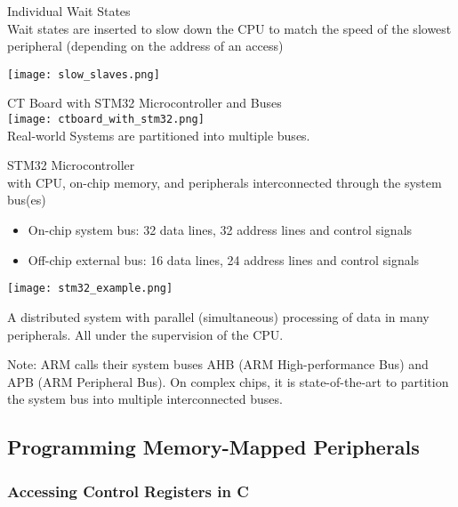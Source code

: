 \begin{KR}{Individual Wait States}\\
    Wait states are inserted to slow down the CPU to match the speed of the slowest peripheral (depending on the address of an access)

    \texttt{[image: slow\_slaves.png]}    
\end{KR}

\begin{example2}{CT Board with STM32 Microcontroller and Buses}\\
    \texttt{[image: ctboard\_with\_stm32.png]}\\
    Real-world Systems are partitioned into multiple buses.
\end{example2}

\begin{example2}{STM32 Microcontroller}\\
    with CPU, on-chip memory, and peripherals interconnected through the system bus(es)
    \begin{itemize}
        \item On-chip system bus: 32 data lines, 32 address lines and control signals
        \item Off-chip external bus: 16 data lines, 24 address lines and control signals
    \end{itemize}
    \texttt{[image: stm32\_example.png]}

    A distributed system with parallel (simultaneous) processing of data in many peripherals. All under the supervision of the CPU.
\end{example2}

\begin{remark}
    Note: ARM calls their system buses AHB (ARM High-performance Bus) and APB (ARM
    Peripheral Bus). On complex chips, it is state-of-the-art to partition the system bus into
    multiple interconnected buses.
\end{remark}



\columnbreak

\subsection{Programming Memory-Mapped Peripherals}

\subsubsection{Accessing Control Registers in C}

